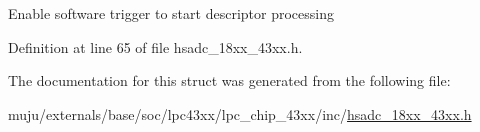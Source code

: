 Enable software trigger to start descriptor processing 

Definition at line 65 of file hsadc\+\_\+18xx\+\_\+43xx.\+h.



The documentation for this struct was generated from the following file\+:\begin{DoxyCompactItemize}
\item 
muju/externals/base/soc/lpc43xx/lpc\+\_\+chip\+\_\+43xx/inc/\hyperlink{hsadc__18xx__43xx_8h}{hsadc\+\_\+18xx\+\_\+43xx.\+h}\end{DoxyCompactItemize}
